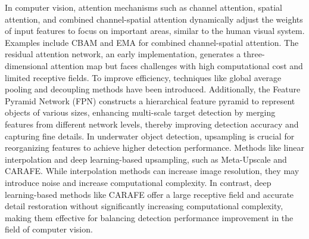 In computer vision, attention mechanisms such as channel attention, spatial attention, and combined channel-spatial attention dynamically adjust the weights of input features to focus on important areas, similar to the human visual system. Examples include CBAM\cite{CBAM: Convolutional Block Attention Module} and EMA for combined channel-spatial attention. The residual attention network\cite{Residual Attention Network for Image Classification}, an early implementation, generates a three-dimensional attention map but faces challenges with high computational cost and limited receptive fields. To improve efficiency, techniques like global average pooling and decoupling methods have been introduced. Additionally, the Feature Pyramid Network (FPN) constructs a hierarchical feature pyramid to represent objects of various sizes, enhancing multi-scale target detection by merging features from different network levels, thereby improving detection accuracy and capturing fine details. In underwater object detection, upsampling is crucial for reorganizing features to achieve higher detection performance. Methods like linear interpolation and deep learning-based upsampling, such as Meta-Upscale\cite{Meta-SR: A Magnification-Arbitrary Network for Super-Resolution} and CARAFE. While interpolation methods can increase image resolution, they may introduce noise and increase computational complexity. In contrast, deep learning-based methods like CARAFE offer a large receptive field and accurate detail restoration without significantly increasing computational complexity, making them effective for balancing detection performance improvement in the field of computer vision.